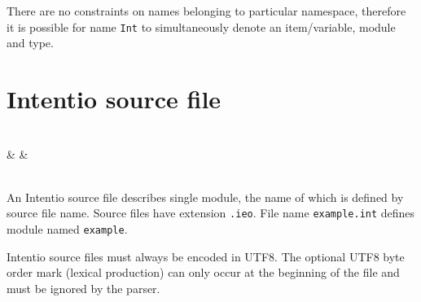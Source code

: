 There are no constraints on names belonging to particular namespace, therefore it is possible for name \texttt{Int} to simultaneously denote an item/variable, module and type.

\section{Intentio source file}

\begin{bnf}
   \eq {} \\
            & &  \\
  \\
   \eq {} 
\end{bnf}

An Intentio source file describes single module, the name of which is defined by source file name. Source files have extension \lstinline{.ieo}. File name \lstinline{example.int} defines module named \lstinline{example}.

\begin{bnfutils}
Intentio source files must always be encoded in UTF8. The optional UTF8 byte order mark (lexical  production) can only occur at the beginning of the file and must be ignored by the parser.
\end{bnfutils}
